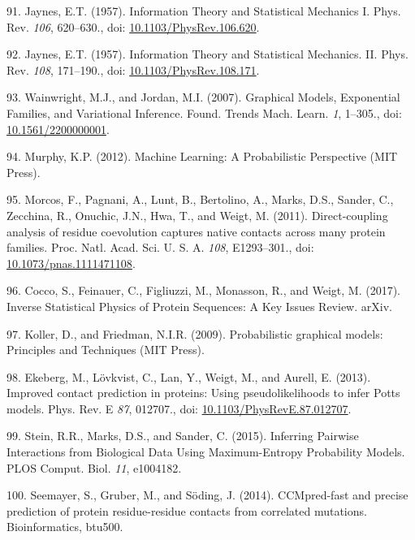 \documentclass[11pt,a4paper,twoside]{book}
\theoremstyle{definition}
\theoremstyle{definition}
\theoremstyle{remark}
\begin{document}
\hypertarget{ref-Jaynes1957a}{}
91. Jaynes, E.T. (1957). Information Theory and Statistical Mechanics I.
Phys. Rev. \emph{106}, 620--630., doi:
\href{https://doi.org/10.1103/PhysRev.106.620}{10.1103/PhysRev.106.620}.

\hypertarget{ref-Jaynes1957b}{}
92. Jaynes, E.T. (1957). Information Theory and Statistical Mechanics.
II. Phys. Rev. \emph{108}, 171--190., doi:
\href{https://doi.org/10.1103/PhysRev.108.171}{10.1103/PhysRev.108.171}.

\hypertarget{ref-Wainwright2007}{}
93. Wainwright, M.J., and Jordan, M.I. (2007). Graphical Models,
Exponential Families, and Variational Inference. Found. Trends Mach.
Learn. \emph{1}, 1--305., doi:
\href{https://doi.org/10.1561/2200000001}{10.1561/2200000001}.

\hypertarget{ref-Murphy2012}{}
94. Murphy, K.P. (2012). Machine Learning: A Probabilistic Perspective
(MIT Press).

\hypertarget{ref-Morcos2011}{}
95. Morcos, F., Pagnani, A., Lunt, B., Bertolino, A., Marks, D.S.,
Sander, C., Zecchina, R., Onuchic, J.N., Hwa, T., and Weigt, M. (2011).
Direct-coupling analysis of residue coevolution captures native contacts
across many protein families. Proc. Natl. Acad. Sci. U. S. A.
\emph{108}, E1293--301., doi:
\href{https://doi.org/10.1073/pnas.1111471108}{10.1073/pnas.1111471108}.

\hypertarget{ref-Cocco2017}{}
96. Cocco, S., Feinauer, C., Figliuzzi, M., Monasson, R., and Weigt, M.
(2017). Inverse Statistical Physics of Protein Sequences: A Key Issues
Review. arXiv.

\hypertarget{ref-Koller2009}{}
97. Koller, D., and Friedman, N.I.R. (2009). Probabilistic graphical
models: Principles and Techniques (MIT Press).

\hypertarget{ref-Ekeberg2013}{}
98. Ekeberg, M., Lövkvist, C., Lan, Y., Weigt, M., and Aurell, E.
(2013). Improved contact prediction in proteins: Using pseudolikelihoods
to infer Potts models. Phys. Rev. E \emph{87}, 012707., doi:
\href{https://doi.org/10.1103/PhysRevE.87.012707}{10.1103/PhysRevE.87.012707}.

\hypertarget{ref-Stein2015a}{}
99. Stein, R.R., Marks, D.S., and Sander, C. (2015). Inferring Pairwise
Interactions from Biological Data Using Maximum-Entropy Probability
Models. PLOS Comput. Biol. \emph{11}, e1004182.

\hypertarget{ref-Seemayer2014}{}
100. Seemayer, S., Gruber, M., and Söding, J. (2014). CCMpred-fast and
precise prediction of protein residue-residue contacts from correlated
mutations. Bioinformatics, btu500.
\end{document}
